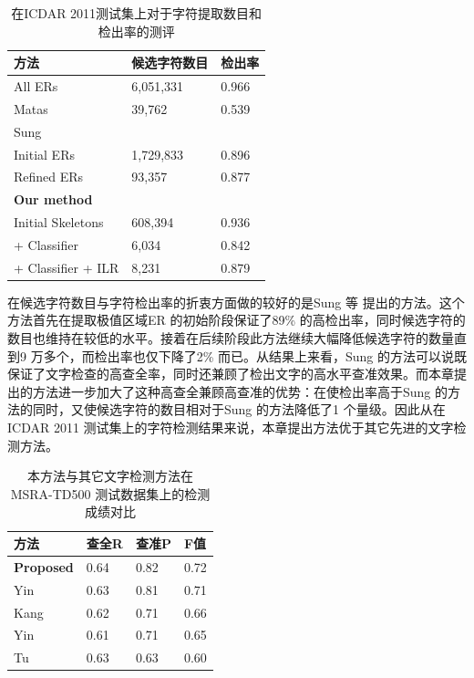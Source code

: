         \begin{table}[htbp]
        \centering
        \caption{在ICDAR 2011测试集上对于字符提取数目和检出率的测评}
        \begin{tabular}{p{} p{} p{}}
        \toprule
        方法 & 候选字符数目 & 检出率 \\
        \midrule
        All ERs & 6,051,331 & 0.966 \\
        Matas\cite{Matas2004Robust} & 39,762 & 0.539 \\
        Sung\cite{Sung2015Scene} &  &  \\
        \quad Initial ERs & 1,729,833 & 0.896 \\
        \quad Refined ERs & 93,357 & 0.877 \\
        \textbf{Our method}  &  &  \\
        \quad Initial Skeletons & 608,394 & 0.936 \\
        \quad + Classifier & 6,034 & 0.842 \\
        \quad + Classifier + ILR & 8,231 & 0.879 \\
        \bottomrule
        \end{tabular}
        \label{tab.c3_icdar11}
        \end{table}

        在候选字符数目与字符检出率的折衷方面做的较好的是Sung 等\cite{Sung2015Scene} 提出的方法。这个方法首先在提取极值区域ER 的初始阶段保证了89\% 的高检出率，同时候选字符的数目也维持在较低的水平。接着在后续阶段此方法继续大幅降低候选字符的数量直到9 万多个，而检出率也仅下降了2\% 而已。从结果上来看，Sung 的方法可以说既保证了文字检查的高查全率，同时还兼顾了检出文字的高水平查准效果。而本章提出的方法进一步加大了这种高查全兼顾高查准的优势：在使检出率高于Sung 的方法的同时，又使候选字符的数目相对于Sung 的方法降低了1 个量级。因此从在ICDAR 2011 测试集上的字符检测结果来说，本章提出方法优于其它先进的文字检测方法。

        \begin{table}[!h]
        \centering
        \caption{ 本方法与其它文字检测方法在MSRA-TD500 测试数据集上的检测成绩对比}
        \begin{tabular}{p{} p{} p{} p{}}
        \toprule
        方法 & 查全R & 查准P & F值 \\
        \midrule
        \textbf{Proposed} & 0.64 & 0.82 & 0.72 \\
        Yin\cite{Yin2015Multi} & 0.63 & 0.81 & 0.71 \\
        Kang\cite{Kang2014Orientation} & 0.62 & 0.71 & 0.66 \\
        Yin\cite{Yin2013Robust} & 0.61 & 0.71 & 0.65 \\
        Tu\cite{Tu2012Detecting} & 0.63 & 0.63 & 0.60\\
        \bottomrule
        \end{tabular}
        \label{tab.c3_msra}
        \end{table}

